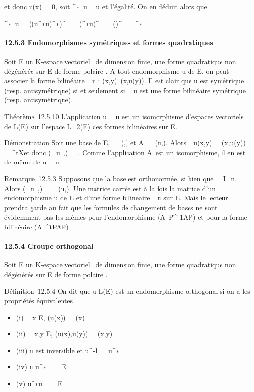 \documentclass[]{article}
\begin{document}
et donc u(x) = 0, soit
\mathrmKeru^∗~u
\subset~\mathrmKer~u et l'égalité.
On en déduit alors que

\mathrmImu^∗~u =
(\mathrmKer(u^∗u)^∗)^\bot~
=
(\mathrmKeru^∗u)^\bot~
=
(\mathrmKeru)^\bot~
= \mathrmImu^∗~

\paragraph{12.5.3 Endomorphismes symétriques et formes quadratiques}

Soit E un K-espace vectoriel ~de dimension finie, \Phi une forme
quadratique non dégénérée sur E de forme polaire \phi. A tout endomorphisme
u de E, on peut associer la forme bilinéaire \psi_u :
(x,y)\mapsto~\phi(x,u(y)). Il est clair que u est
symétrique (resp. antisymétrique) si et seulement si~\psi_u est
une forme bilinéaire symétrique (resp. antisymétrique).

Théorème~12.5.10 L'application u\mapsto~\psi_u
est un isomorphisme d'espaces vectoriels de L(E) sur l'espace
L_2(E) des formes bilinéaires sur E.

Démonstration Soit  une base de E, \Omega =\
\mathrmMat (\phi,) et A =\
\mathrmMat (u,). Alors \psi_u(x,y) =
\phi(x,u(y)) = ^tX\OmegaAY et donc
\mathrmMat (\psi_u~,\mathcal{E})
= \OmegaA. Comme l'application A\mapsto~\OmegaA est un
isomorphisme, il en est de même de
u\mapsto~\psi_u.

Remarque~12.5.3 Supposons que la base  est orthonormée, si bien que \Omega =
I_n. Alors
\mathrmMat (\psi_u~,)
= \mathrmMat~ (u,\mathcal{E}). Une
matrice carrée est à la fois la matrice d'un endomorphisme u de E et
d'une forme bilinéaire \psi_u sur E. Mais le lecteur prendra garde
au fait que les formules de changement de bases ne sont évidemment pas
les mêmes pour l'endomorphisme
(A\mapsto~P^-1AP) et pour la forme
bilinéaire (A\mapsto~^tPAP).

\paragraph{12.5.4 Groupe orthogonal}

Soit E un K-espace vectoriel ~de dimension finie, \Phi une forme
quadratique non dégénérée sur E de forme polaire \phi.

Définition~12.5.4 On dit que u \in L(E) est un endomorphisme orthogonal si
on a les propriétés équivalentes

\begin{itemize}
\itemsep1pt\parskip0pt
\item
  (i) \forall~~x \in E, \Phi(u(x)) = \Phi(x)
\item
  (ii) \forall~~x,y \in E, \phi(u(x),u(y)) = \phi(x,y)
\item
  (iii) u est inversible et u^-1 = u^∗
\item
  (iv) u \cdot u^∗ = \mathrmId_E
\item
  (v) u^∗\cdot u = \mathrmId_E
\end{itemize}
\end{document}
